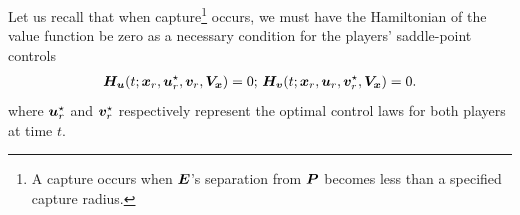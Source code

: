 Let us recall that %
%
when capture\footnote{A capture occurs when $\bm{E}$'s separation from $\bm{P}$ becomes less than a specified \eg capture radius.} occurs, we must have the Hamiltonian of the value function be zero as a necessary condition for the players' saddle-point controls~\cite{Merz1972,Isaacs1965} \ie
%
%   
%
\begin{align}
	\hamfunc_{\control}(t; \state_r, \control_r^\star, \disturb_r, \valuefunc_{\state}) = 0; \,\hamfunc_{\disturb}(t; \state_r, \control_r, \disturb_r^\star, \valuefunc_{\state}) = 0.
	\label{eq:saddle_funcs}
\end{align}                                                                       %
where $\bm{u}_r^\star$ and $\bm{v}_r^\star$ respectively represent the optimal control laws for both players at time $t$.

